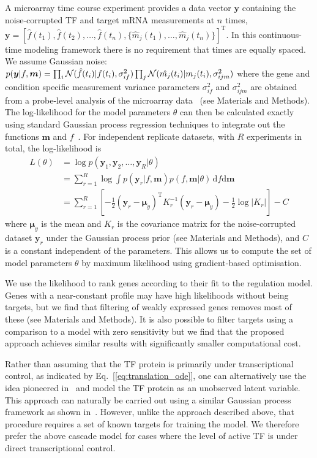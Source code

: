 \documentclass{pnastwo}
\begin{document}
\begin{article}
A microarray time course experiment provides a data vector $\bm y$ containing the noise-corrupted TF and target mRNA
measurements at $n$ times,
$\bm
y=[\hat{f}(t_1),\hat{f}(t_2),\ldots,\hat{f}(t_n),\{\hat{m}_j(t_1),\ldots,\hat{m}_j(t_n)\}]^\mathrm{T}$.
In this continuous-time modeling framework there is no
requirement that times are equally spaced. We assume Gaussian noise:
$p(\bm y|f,\bm m)=\prod_i{\cal
  N}(\hat{f}(t_i)|f(t_i),\sigma_{if}^2)\prod_j{\cal
  N}(\hat{m_j}(t_i)|m_j(t_i),\sigma_{ijm}^2)$ where the gene and condition
specific measurement variance parameters $\sigma_{if}^2$ and
$\sigma_{ijm}^2$ are obtained from a probe-level analysis of the
microarray data~\cite{Liu2005,Pearson2009} (see
Materials and Methods). The log-likelihood for the model parameters
$\theta$ can then be calculated exactly using standard Gaussian process regression
techniques to integrate out the functions $\bm m$ and
$f$~\cite{Rasmussen2006}. For independent replicate datasets, with
$R$ experiments in total, the
log-likelihood is
\begin{equation*}
  \begin{split}
    L(\theta) & = \log p(\bm y_1,\bm y_2,\ldots,\bm y_{R}|\theta) \\
    & = \sum_{r=1}^{R} \log \!\int 
    \!\!p(\bm y_r|f,\bm m)p(f,\bm m|\theta) \, \mathrm{d}\!f\mathrm{d}\bm m\\
    & = \sum_{r=1}^{R} \left[-\frac{1}{2}(\bm y_r - \bm \mu_y)^\mathrm{T} K_r^{-1} (\bm y_r - \bm \mu_y) -
      \frac{1}{2}\log|K_r|\right] -C      %
  \end{split}
\end{equation*}
where $\bm \mu_y$ is the mean and $K_r$ is the covariance matrix for the
noise-corrupted dataset $\bm y_r$ under the Gaussian process prior (see
Materials and Methods), and $C$ is a constant independent of the
parameters.  This allows us to compute the set of model
parameters $\theta$ by maximum
likelihood using gradient-based optimisation. 

We use the likelihood to rank genes according to their fit to the
regulation model. Genes with a
near-constant profile may have high likelihoods without being targets,
but we find that filtering of weakly expressed genes removes most of
these (see Materials and Methods). It is also possible to filter
targets using a comparison to a model with
zero sensitivity but we find that the proposed approach achieves
similar results with significantly smaller computational cost.

Rather than assuming that the TF protein is primarily under
transcriptional control, as indicated by
Eq.~[\ref{eq:translation_ode}], one can alternatively use the idea pioneered
in~\cite{Barenco2006a,Khanin2006} and model the TF protein as an unobserved
latent variable. This approach can naturally be carried out using a
similar Gaussian process framework as shown in~\cite{Gao2008}.
However, 
unlike the approach described above,
that procedure requires a set of known
targets for training the model. %
We therefore
prefer the above cascade model for cases where the level of active
TF is under direct transcriptional control. 


\end{article}
\end{document}
